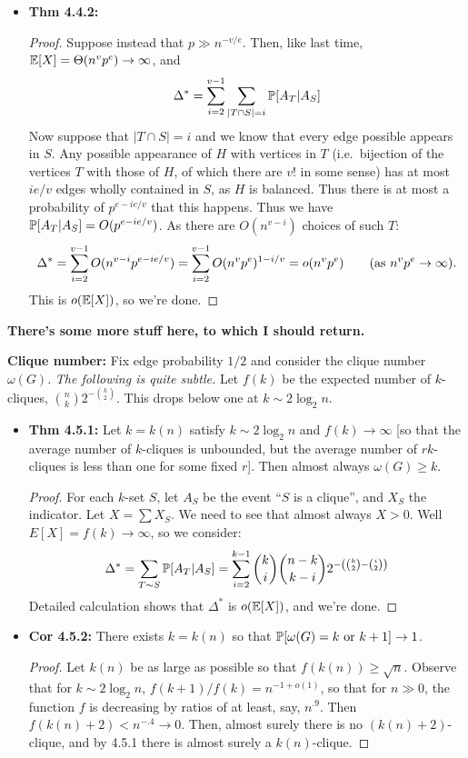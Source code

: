 \documentclass[11pt]{article}
\newenvironment{INT}[1][]{\begin{itemize}\small\item\textbf{#1}}{\end{itemize}}
\newcommand{\moreINT}[1][]{\item\textbf{#1}}
\begin{document}
\begin{chapter4}
\begin{itemise}
\begin{INT}[Thm 4.4.2:]
\begin{proof}
\INDENT Suppose instead that $p\gg n^{-v/e}$. Then, like last time, $\operatorname{\mathbb{E}}[X]=\Theta(n^vp^e)\rightarrow\infty$, and
\[\Delta^*=\sum_{i=2}^{v-1}\sum_{|T\cap S|=i}\operatorname{\mathbb{P}}[A_T|A_S]\]
Now suppose that $|T\cap S|=i$ and we know that every edge possible appears in $S$. Any possible appearance of $H$ with vertices in $T$ (i.e.\ bijection of the vertices $T$ with those of $H$, of which there are $v!$ in some sense) has at most $ie/v$ edges wholly contained in $S$, as $H$ is balanced. Thus there is at most a probability of $p^{e-ie/v}$ that this happens. Thus we have $\operatorname{\mathbb{P}}[A_T|A_S]=O(p^{e-ie/v})$. As there are $O(n^{v-i})$ choices of such $T$:
\[\Delta^*=\sum_{i=2}^{v-1}O(n^{v-i}p^{e-ie/v})=\sum_{i=2}^{v-1}O(n^{v}p^{e})^{1-i/v}=o(n^vp^e)\text{\qquad(as $n^vp^e\rightarrow\infty$).}\]
This is $o(\operatorname{\mathbb{E}}[X])$, so we're done.
\end{proof}
\end{INT}
\item \textbf{There's some more stuff here, to which I should return.}
\item \textbf{Clique number:} Fix edge probability $1/2$ and consider the clique number $\omega(G)$. \textit{The following is quite subtle.} Let $f(k)$ be the expected number of $k$-cliques, ${n\choose k}2^{-{k\choose2}}$. This drops below one at $k\sim 2\log_2n$.
\begin{INT}[Thm 4.5.1:] Let $k=k(n)$ satisfy $k\sim 2\log_2n$ and $f(k)\rightarrow\infty$ [so that the average number of $k$-cliques is unbounded, but the average number of $rk$-cliques is less than one for some fixed $r$]. Then almost always $\omega(G)\geq k$.
\begin{proof}
For each $k$-set $S$, let $A_S$ be the event ``$S$ is a clique'', and $X_S$ the indicator. Let $X=\sum X_S$. We need to see that almost always $X>0$. Well $E[X]=f(k)\rightarrow\infty$, so we consider:
\[\Delta^*=\sum_{T\sim S}\operatorname{\mathbb{P}}[A_T|A_S]=\sum_{i=2}^{k-1}{k\choose i}{n-k\choose k-i}2^{-\left({k\choose2}-{i\choose2}\right)}\]
Detailed calculation shows that $\Delta^*$ is $o(\operatorname{\mathbb{E}}[X])$, and we're done.
\end{proof}
\moreINT[Cor 4.5.2:] There exists $k=k(n)$ so that $\operatorname{\mathbb{P}}[\omega(G)=k\textup{ or }k+1]\rightarrow1$.
\begin{proof}
Let $k(n)$ be as large as possible so that $f(k(n))\geq\sqrt n$. Observe that for $k\sim 2\log_2 n$, $f(k+1)/f(k)=n^{-1+o(1)}$, so that for $n\gg0$, the function $f$ is decreasing by ratios of at least, say, $n^{.9}$. Then $f(k(n)+2)<n^{-.4}\rightarrow0$. Then, almost surely there is no $(k(n)+2)$-clique, and by 4.5.1 there is almost surely a $k(n)$-clique.

\end{proof}
\end{INT}
\end{itemise}
\end{chapter4}
\end{document}
